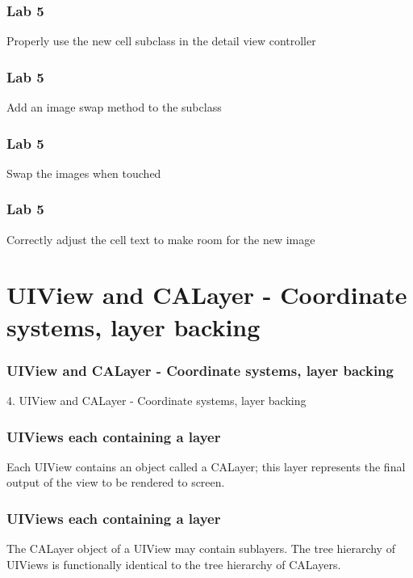 \documentclass[10pt]{beamer}
\begin{document}
\begin{frame}[fragile]
  \frametitle{Lab 5}
  Properly use the new cell subclass in the detail view controller

\end{frame}

\begin{frame}[fragile]
  \frametitle{Lab 5}
  Add an image swap method to the subclass

\end{frame}

\begin{frame}[fragile]
  \frametitle{Lab 5}
  Swap the images when touched

\end{frame}

\begin{frame}[fragile]
  \frametitle{Lab 5}
  Correctly adjust the cell text to make room for the new image

\end{frame}

    

   
  

  
    
\section{UIView and CALayer - Coordinate systems, layer backing}
\begin{frame}[fragile]
  \frametitle{UIView and CALayer - Coordinate systems, layer backing}
  4. UIView and CALayer - Coordinate systems, layer backing
\end{frame}


    
\begin{frame}[fragile]
  \frametitle{UIViews each containing a layer}
  Each UIView contains an object called a CALayer; this layer represents the final output of the view to be rendered to screen.

\end{frame}

\begin{frame}[fragile]
  \frametitle{UIViews each containing a layer}
  The CALayer object of a UIView may contain sublayers. The tree hierarchy of UIViews is functionally identical to the tree hierarchy of CALayers.

\end{frame}
\end{document}
